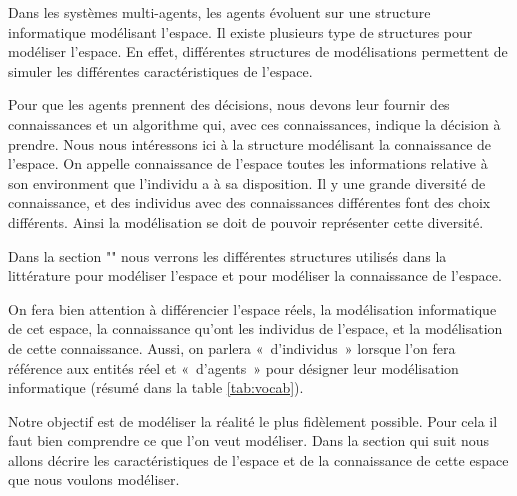\documentclass[a4paper]{article}
\begin{document}
Dans les systèmes multi-agents, les agents évoluent sur une structure
informatique modélisant l'espace. Il existe plusieurs type de structures pour
modéliser l'espace. En effet, différentes structures de modélisations permettent
de simuler les différentes caractéristiques de l'espace.

Pour que les agents prennent des décisions, nous devons leur fournir des
connaissances et un algorithme qui, avec ces connaissances, indique la décision
à prendre. Nous nous intéressons ici à la structure modélisant la connaissance
de l'espace. On appelle connaissance de l'espace toutes les informations
relative à son environment que l'individu a à sa disposition. Il y une grande
diversité de connaissance, et des individus avec des connaissances différentes
font des choix différents. Ainsi la modélisation se doit de pouvoir représenter
cette diversité.

Dans la section "" nous verrons les différentes structures
utilisés dans la littérature pour modéliser l'espace et pour modéliser la
connaissance de l'espace.

On fera bien attention à différencier l'espace réels, la modélisation
informatique de cet espace, la connaissance qu'ont les individus de l'espace, et
la modélisation de cette connaissance. Aussi, on parlera «~d'individus~» lorsque
l'on fera référence aux entités réel et «~d'agents~» pour désigner leur
modélisation informatique (résumé dans la table \ref{tab:vocab}).

\begin{table}
  \noindent{}
  \caption{Le vocabulaire utilisé}
  \label{tab:vocab}
\end{table}

Notre objectif est de modéliser la réalité le plus fidèlement possible. Pour
cela il faut bien comprendre ce que l'on veut modéliser. Dans la section qui
suit nous allons décrire les caractéristiques de l'espace et de la connaissance
de cette espace que nous voulons modéliser.
\end{document}
